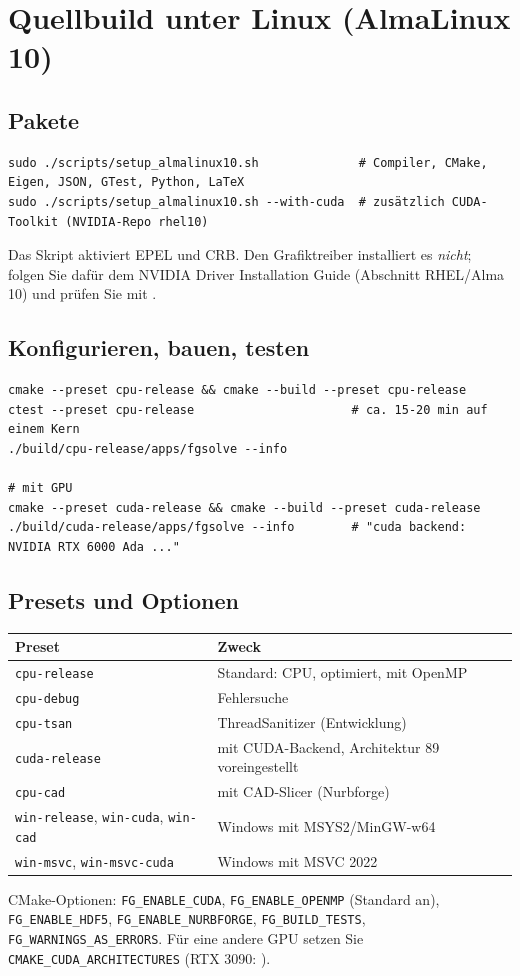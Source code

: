 \section{Quellbuild unter Linux (AlmaLinux 10)}\label{sec:inst-linux}
%
\subsection{Pakete}
\begin{lstlisting}[style=shell]
sudo ./scripts/setup_almalinux10.sh              # Compiler, CMake, Eigen, JSON, GTest, Python, LaTeX
sudo ./scripts/setup_almalinux10.sh --with-cuda  # zusätzlich CUDA-Toolkit (NVIDIA-Repo rhel10)
\end{lstlisting}
Das Skript aktiviert EPEL und CRB. Den Grafiktreiber installiert es \emph{nicht}; folgen Sie dafür dem NVIDIA Driver
Installation Guide (Abschnitt RHEL/Alma 10) und prüfen Sie mit .

\subsection{Konfigurieren, bauen, testen}
\begin{lstlisting}[style=shell]
cmake --preset cpu-release && cmake --build --preset cpu-release
ctest --preset cpu-release                      # ca. 15-20 min auf einem Kern
./build/cpu-release/apps/fgsolve --info

# mit GPU
cmake --preset cuda-release && cmake --build --preset cuda-release
./build/cuda-release/apps/fgsolve --info        # "cuda backend: NVIDIA RTX 6000 Ada ..."
\end{lstlisting}

\subsection{Presets und Optionen}
\begin{center}
\small
\begin{tabularx}{\linewidth}{lY}
\toprule
Preset & Zweck \\
\midrule
\texttt{cpu-release} & Standard: CPU, optimiert, mit OpenMP \\
\texttt{cpu-debug} & Fehlersuche \\
\texttt{cpu-tsan} & ThreadSanitizer (Entwicklung) \\
\texttt{cuda-release} & mit CUDA-Backend, Architektur 89 voreingestellt \\
\texttt{cpu-cad} & mit CAD-Slicer (Nurbforge) \\
\texttt{win-release}, \texttt{win-cuda}, \texttt{win-cad} & Windows mit MSYS2/MinGW-w64 \\
\texttt{win-msvc}, \texttt{win-msvc-cuda} & Windows mit MSVC 2022 \\
\bottomrule
\end{tabularx}
\end{center}
CMake-Optionen: \texttt{FG\_ENABLE\_CUDA}, \texttt{FG\_ENABLE\_OPENMP} (Standard an), \texttt{FG\_ENABLE\_HDF5},
\texttt{FG\_ENABLE\_NURBFORGE}, \texttt{FG\_BUILD\_TESTS}, \texttt{FG\_WARNINGS\_AS\_ERRORS}. Für eine andere
GPU setzen Sie \texttt{CMAKE\_CUDA\_ARCHITECTURES} (RTX 3090: ).

